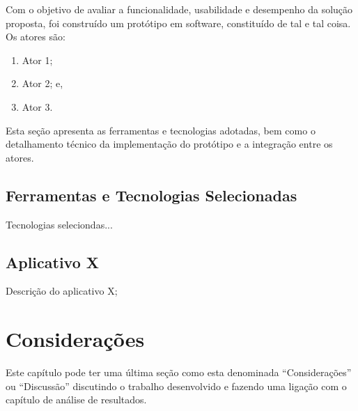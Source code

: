 Com o objetivo de avaliar a funcionalidade, usabilidade e desempenho da solução proposta, foi construído um protótipo em software, constituído de tal e tal coisa. Os atores são:

\begin{enumerate}
    \item Ator 1;
    \item Ator 2; e,
    \item Ator 3.
\end{enumerate}

Esta seção apresenta as ferramentas e tecnologias adotadas, bem como o detalhamento técnico da implementação do protótipo e a integração entre os atores.



\subsection{Ferramentas e Tecnologias Selecionadas}
\label{ss_c4_tecnologias}

Tecnologias seleciondas...




\subsection{Aplicativo X}
\label{ss_c4_aplicativoX}

Descrição do aplicativo X;



\section{Considerações}
\label{s_c4_consideracoes}

Este capítulo pode ter uma última seção como esta denominada ``Considerações'' ou ``Discussão'' discutindo o trabalho desenvolvido e fazendo uma ligação com o capítulo de análise de resultados.